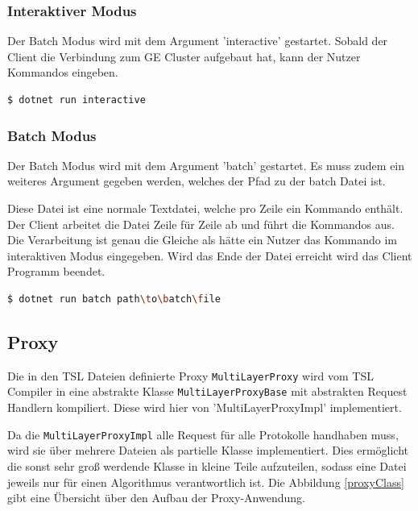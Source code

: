 \subsubsection{Interaktiver Modus}

Der Batch Modus wird mit dem Argument 'interactive' gestartet. Sobald der Client die Verbindung zum GE Cluster aufgebaut hat, kann der Nutzer Kommandos eingeben.


\begin{lstlisting}[language=bash]
  $ dotnet run interactive
\end{lstlisting}


\subsubsection{Batch Modus}
 Der Batch Modus wird mit dem Argument 'batch' gestartet. Es muss zudem ein weiteres Argument gegeben werden, welches der Pfad zu der batch Datei ist.

 Diese Datei ist eine normale Textdatei, welche pro Zeile ein Kommando enthält. Der Client arbeitet die Datei Zeile für Zeile ab und führt die Kommandos aus.
 Die Verarbeitung ist genau die Gleiche als hätte ein Nutzer das Kommando im interaktiven Modus eingegeben. Wird das Ende der Datei erreicht wird das Client Programm beendet.

\begin{lstlisting}[language=bash]
  $ dotnet run batch path\to\batch\file 
\end{lstlisting}


\subsection{Proxy}



Die in den TSL Dateien definierte Proxy \verb|MultiLayerProxy| wird vom TSL Compiler in eine abstrakte Klasse \verb|MultiLayerProxyBase| mit abstrakten Request Handlern kompiliert. Diese wird hier von 'MultiLayerProxyImpl' implementiert.

Da die \verb|MultiLayerProxyImpl| alle Request für alle Protokolle handhaben muss, wird sie über mehrere Dateien als partielle Klasse implementiert. Dies ermöglicht die sonst sehr groß werdende Klasse in kleine Teile aufzuteilen, sodass eine Datei jeweils nur für einen Algorithmus verantwortlich ist.
Die Abbildung \ref{proxyClass} gibt eine Übersicht über den Aufbau der Proxy-Anwendung.



